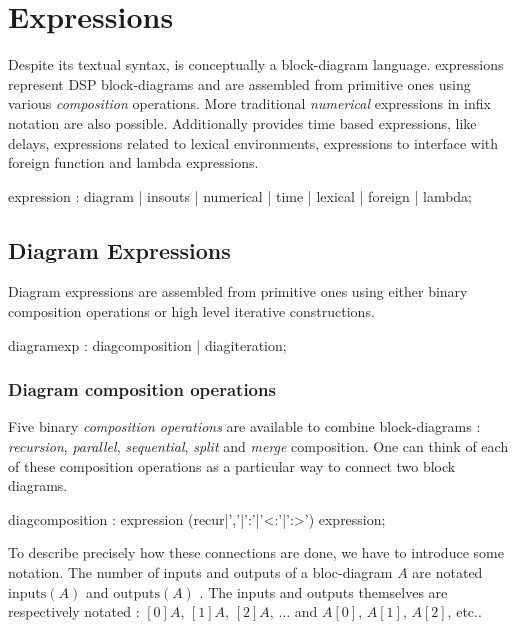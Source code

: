 \section{Expressions}

Despite its textual syntax, \faust is conceptually a block-diagram language. \faust expressions represent DSP block-diagrams and are assembled from primitive ones using various \textit{composition} operations. More traditional \textit{numerical} expressions in infix notation are also possible. Additionally \faust provides time based expressions, like delays, expressions related to lexical environments, expressions to interface with foreign function and lambda expressions.

\begin{rail}
expression : diagram | insouts | numerical | time | lexical | foreign | lambda;
\end{rail}
  
\subsection{Diagram Expressions}

Diagram expressions are assembled from primitive ones using either binary composition operations or high level iterative constructions.
 
\begin{rail}
diagramexp : diagcomposition | diagiteration;
\end{rail}

\subsubsection{Diagram composition operations} 
Five binary \emph{composition operations} are available to combine block-diagrams : \textit{recursion}, \textit{parallel}, \textit{sequential}, \textit{split} and \textit{merge} composition. One can think of each  of these composition operations as a particular way to connect two block diagrams. 

\begin{rail}
diagcomposition : expression (recur|','|':'|'<:'|':>') expression;
\end{rail}

To describe precisely how these connections are done, we have to introduce some notation.  The number of inputs and outputs of a bloc-diagram $A$ are notated $\mathrm{inputs}(A)$ and $\mathrm{outputs}(A)$ . The inputs and outputs themselves are respectively notated : $[0]A$, $[1]A$, $[2]A$, $\ldots$ and $A[0]$, $A[1]$, $A[2]$, etc.. 

